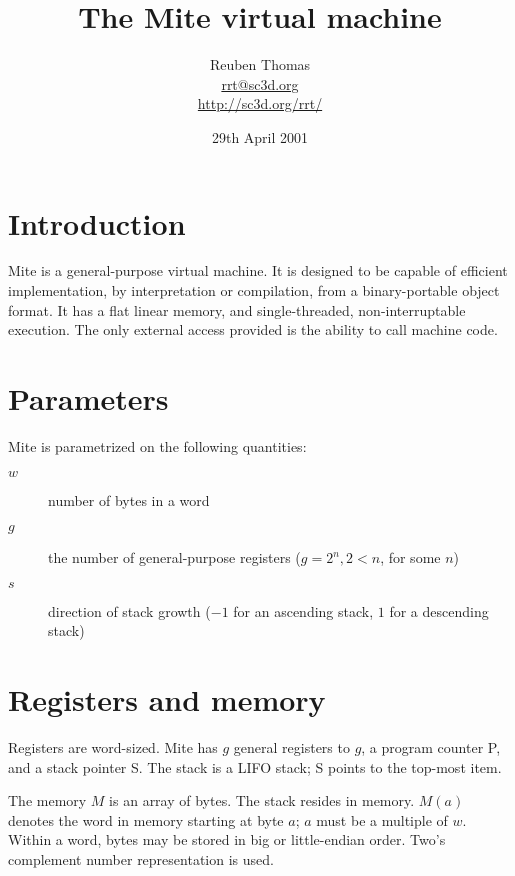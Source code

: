 \documentclass[english]{scrartcl}
\newcommand{\synfont}{\sffamily}
\newcommand{\syn}[1]{{\synfont #1}}
\begin{document}
\title{The Mite virtual machine}
\author{Reuben Thomas\\\url{rrt@sc3d.org}\\\url{http://sc3d.org/rrt/}}
\date{29th April 2001}
\maketitle



\section{Introduction}

Mite is a general-purpose virtual machine. It is designed to be capable of
efficient implementation, by interpretation or compilation, from a
binary-portable object format. It has a flat linear memory, and
single-threaded, non-interruptable execution. The only external access
provided is the ability to call machine code.



\section{Parameters}

Mite is parametrized on the following quantities:

\begin{description}
\item[$w$]number of bytes in a word

\item[$g$]the number of general-purpose registers ($g=2^n, 2<n$, for some $n$)

\item[$s$]direction of stack growth ($-1$ for an ascending stack, $1$ for a
descending stack)
\end{description}



\section{Registers and memory}

Registers are word-sized. Mite has $g$ general registers \syn{1} to $g$, a
program counter \syn{P}, and a stack pointer \syn{S}. The stack is a LIFO
stack; \syn{S} points to the top-most item.

The memory $M$ is an array of bytes. The stack resides in memory. $M(a)$
denotes the word in memory starting at byte $a$; $a$ must be a multiple of
$w$. Within a word, bytes may be stored in big or little-endian order. Two's
complement number representation is used.
\end{document}
